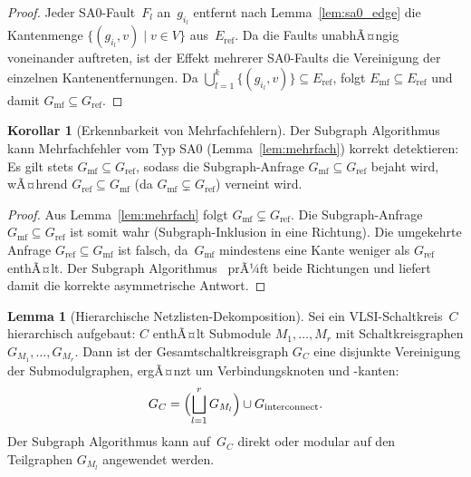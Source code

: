 ﻿\documentclass[a4paper,12pt]{article}
\theoremstyle{definition}
\newtheorem{lemma}{Lemma}
\newtheorem{korollar}{Korollar}
\begin{document}
\begin{proof}
  Jeder SA0-Fault~$F_l$ an~$g_{i_l}$ entfernt nach Lemma~\ref{lem:sa0_edge}
  die Kantenmenge $\{(g_{i_l}, v) \mid v \in V\}$ aus~$E_{\mathrm{ref}}$.
  Da die Faults unabhÃ¤ngig voneinander auftreten, ist der Effekt mehrerer
  SA0-Faults die Vereinigung der einzelnen Kantenentfernungen.
  Da $\bigcup_{l=1}^k \{(g_{i_l}, v)\} \subseteq E_{\mathrm{ref}}$, folgt
  $E_{\mathrm{mf}} \subseteq E_{\mathrm{ref}}$ und damit
  $G_{\mathrm{mf}} \subseteq G_{\mathrm{ref}}$.
\end{proof}

\begin{korollar}[Erkennbarkeit von Mehrfachfehlern]
  \label{kor:mehrfach}
  Der Subgraph Algorithmus kann Mehrfachfehler vom Typ SA0
  (Lemma~\ref{lem:mehrfach}) korrekt detektieren: Es gilt stets
  $G_{\mathrm{mf}} \subseteq G_{\mathrm{ref}}$, sodass die
  Subgraph-Anfrage $G_{\mathrm{mf}} \subseteq G_{\mathrm{ref}}$ bejaht
  wird, wÃ¤hrend $G_{\mathrm{ref}} \subseteq G_{\mathrm{mf}}$ (da
  $G_{\mathrm{mf}} \subsetneq G_{\mathrm{ref}}$) verneint wird.
\end{korollar}

\begin{proof}
  Aus Lemma~\ref{lem:mehrfach} folgt $G_{\mathrm{mf}} \subsetneq G_{\mathrm{ref}}$.
  Die Subgraph-Anfrage $G_{\mathrm{mf}} \subseteq G_{\mathrm{ref}}$ ist
  somit wahr (Subgraph-Inklusion in eine Richtung).
  Die umgekehrte Anfrage $G_{\mathrm{ref}} \subseteq G_{\mathrm{mf}}$ ist
  falsch, da~$G_{\mathrm{mf}}$ mindestens eine Kante weniger als
  $G_{\mathrm{ref}}$ enthÃ¤lt.
  Der Subgraph Algorithmus~\cite{epp2026subgraph} prÃ¼ft beide Richtungen
  und liefert damit die korrekte asymmetrische Antwort.
\end{proof}

\begin{lemma}[Hierarchische Netzlisten-Dekomposition]
  \label{lem:hierarchie}
  Sei ein VLSI-Schaltkreis~$C$ hierarchisch aufgebaut: $C$ enthÃ¤lt
  Submodule $M_1, \ldots, M_r$ mit Schaltkreisgraphen
  $G_{M_1}, \ldots, G_{M_r}$.
  Dann ist der Gesamtschaltkreisgraph $G_C$ eine disjunkte Vereinigung
  der Submodul\-graphen, ergÃ¤nzt um Verbindungsknoten und -kanten:
  \[
    G_C
    = \Bigl(\bigsqcup_{l=1}^{r} G_{M_l}\Bigr) \cup G_{\mathrm{interconnect}}.
  \]
  Der Subgraph Algorithmus kann auf~$G_C$ direkt oder modular auf den
  Teilgraphen $G_{M_l}$ angewendet werden.
\end{lemma}
\end{document}
